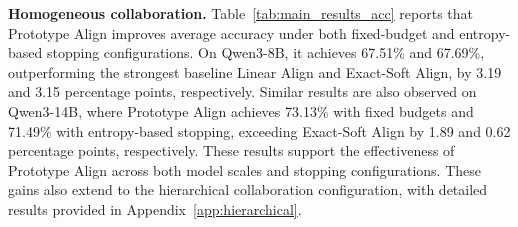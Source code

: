 \documentclass[11pt]{article}
\newcommand{\tabsd}[1]{{\color{tabgray}\scriptsize$\pm$#1}}
\begin{document}

\noindent\textbf{Homogeneous collaboration.}
Table~\ref{tab:main_results_acc} reports that Prototype Align improves average accuracy under both fixed-budget and entropy-based stopping configurations. On Qwen3-8B, it achieves 67.51\% and 67.69\%, outperforming the strongest baseline Linear Align and Exact-Soft Align, by 3.19 and 3.15 percentage points, respectively. Similar results are also observed on Qwen3-14B, where Prototype Align achieves 73.13\% with fixed budgets and 71.49\% with entropy-based stopping, exceeding Exact-Soft Align by 1.89 and 0.62 percentage points, respectively. These results support the effectiveness of Prototype Align across both model scales and stopping configurations. These gains also extend to the hierarchical collaboration configuration, with detailed results provided in Appendix~\ref{app:hierarchical}.
\end{document}
